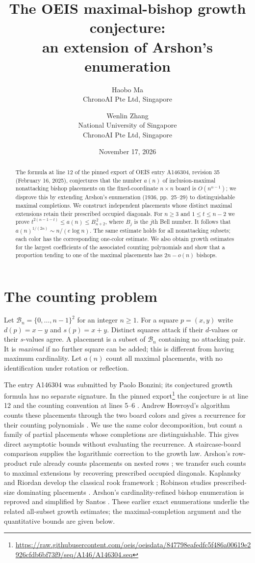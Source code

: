 \documentclass[11pt]{article}
\title{The OEIS maximal-bishop growth conjecture:\\an extension of Arshon's enumeration}
\author{Haobo Ma\\{\small ChronoAI Pte Ltd, Singapore}
\and Wenlin Zhang\\{\small National University of Singapore}\\{\small ChronoAI Pte Ltd, Singapore}}
\date{November 17, 2026}
\begin{document}
\maketitle
\begin{abstract}
The formula at line 12 of the pinned export of OEIS entry A146304,
revision 35 (February 16, 2025),
conjectures that the number $a(n)$ of inclusion-maximal nonattacking bishop
placements on the fixed-coordinate $n\times n$ board is $O(n^{n-1})$;
we disprove this by extending Arshon's enumeration
(1936, pp.~25--29) \cite{arshon} to distinguishable maximal completions.
We construct independent placements whose distinct
maximal extensions retain their prescribed occupied diagonals.
For $n\geq3$ and $1\leq t\leq n-2$ we prove
$t^{2(n-1-t)}\leq a(n)\leq B_{n+2}^{\,2}$, where $B_j$ is the $j$th
Bell number. It follows that $a(n)^{1/(2n)}\sim n/(e\log n)$.
The same estimate holds for all nonattacking subsets; each color has the
corresponding one-color estimate. We also obtain growth estimates for
the largest coefficients of the associated counting polynomials and show
that a proportion tending to one of the maximal placements has
$2n-o(n)$ bishops.
\end{abstract}

\section{The counting problem}
Let $\mathcal{B}_n=\{0,\ldots,n-1\}^2$ for an integer $n\geq1$.
For a square $p=(x,y)$ write $d(p)=x-y$ and $s(p)=x+y$.
Distinct squares attack if their $d$-values or their $s$-values agree.
A placement is a subset of $\mathcal{B}_n$ containing no attacking pair.
It is \emph{maximal} if no further square can be added; this is different
from having maximum cardinality. Let $a(n)$ count all maximal placements,
with no identification under rotation or reflection.

The entry A146304 was submitted by Paolo Bonzini; its conjectured growth
formula has no separate signature. In the pinned export\footnote{\url{https://raw.githubusercontent.com/oeis/oeisdata/847798eafedfc5f486a00619e2926cfdb6bf73f9/seq/A146/A146304.seq}}
the conjecture is at line 12 and the counting convention at lines 5--6
\cite{oeis}. Andrew Howroyd's algorithm counts these placements through
the two board colors and gives a recurrence for their counting polynomials
\cite{howroyd}. We use the same color decomposition, but count a family of
partial placements whose completions are distinguishable. This gives direct
asymptotic bounds without evaluating the recurrence. A staircase-board
comparison supplies the logarithmic correction to the growth law.
Arshon's row-product rule already counts placements on nested rows
\cite[p.~25, equations (1)--(2)]{arshon}; we transfer such counts to
maximal extensions by recovering prescribed occupied diagonals.
Kaplansky and Riordan develop the classical rook framework
\cite{kaplansky}; Robinson studies prescribed-size dominating placements
\cite{robinson}. Arshon's cardinality-refined bishop enumeration is
reproved and simplified by Santos \cite{santos}. These earlier exact
enumerations underlie the related all-subset growth estimates; the
maximal-completion argument and the quantitative bounds are given below.
\end{document}
